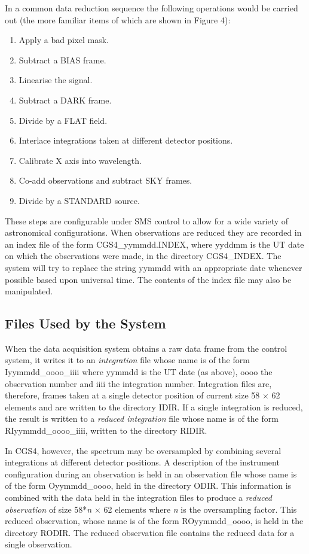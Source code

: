 {In a common data reduction sequence the following operations would be carried
out (the more familiar items of which are shown in Figure 4):

\begin{enumerate}
\item Apply a bad pixel mask.
\item Subtract a {\sf BIAS} frame.
\item Linearise the signal.
\item Subtract a {\sf DARK} frame.
\item Divide by a {\sf FLAT} field.
\item Interlace integrations taken at different detector positions.
\item Calibrate X axis into wavelength.
\item Co-add observations and subtract {\sf SKY} frames.
\item Divide by a {\sf STANDARD} source.
\end{enumerate}

These steps are configurable under SMS control to allow for a wide variety
of astronomical configurations. When observations are reduced they are 
recorded in an index file of the form {\sf CGS4\_yymmdd.INDEX}, where 
{\sf yyddmm} is the UT date on which the observations were made, in the 
directory {\sf CGS4\_INDEX}. The system will try to replace the string 
{\sf yymmdd} with an appropriate date whenever possible based upon universal 
time. The contents of the index file may also be manipulated.

\subsection{Files Used by the System}
\label{files_used_by_the_system}

When the data acquisition system obtains a raw data frame from the
control system, it writes it to an {\em integration} file whose name is of the 
form {\sf Iyymmdd\_oooo\_iiii} where {\sf yymmdd} is the UT date (as above),
{\sf oooo} the observation number and {\sf iiii} the integration 
number. Integration files are, therefore, frames taken at a single 
detector position of current size 58 $\times$ 62 elements and are written to 
the directory {\sf IDIR}. If a single integration is reduced, 
the result is written to a {\em reduced integration} file whose name is of the 
form {\sf RIyymmdd\_oooo\_iiii}, written to the directory {\sf RIDIR}.

In CGS4, however, the spectrum may be oversampled by combining several 
integrations at different detector positions. A description of the instrument 
configuration during an observation is held in an observation file whose 
name is of the form {\sf Oyymmdd\_oooo}, held in the directory {\sf ODIR}. 
This information is combined with the data held in the integration files to 
produce a {\em reduced observation} of size 58*{\em n} $\times$ 62 elements 
where {\em n} is the oversampling factor. This reduced observation, whose 
name is of the form {\sf ROyymmdd\_oooo}, is held in the directory {\sf RODIR}. 
The reduced observation file contains the reduced data for a single observation.

}

